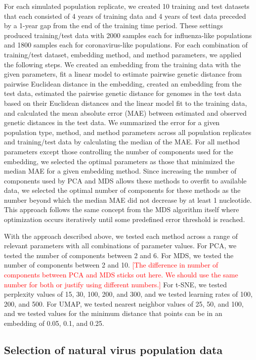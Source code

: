 \documentclass[10pt,letterpaper]{article}
\def\jhc#1{\textcolor{red}{[#1]}}
\begin{document}
For each simulated population replicate, we created 10 training and test datasets that each consisted of 4 years of training data and 4 years of test data preceded by a 1-year gap from the end of the training time period.
These settings produced training/test data with 2000 samples each for influenza-like populations and 1800 samples each for coronavirus-like populations.
For each combination of training/test dataset, embedding method, and method parameters, we applied the following steps.
We created an embedding from the training data with the given parameters, fit a linear model to estimate pairwise genetic distance from pairwise Euclidean distance in the embedding, created an embedding from the test data, estimated the pairwise genetic distance for genomes in the test data based on their Euclidean distances and the linear model fit to the training data, and calculated the mean absolute error (MAE) between estimated and observed genetic distances in the test data.
We summarized the error for a given population type, method, and method parameters across all population replicates and training/test data by calculating the median of the MAE.
For all method parameters except those controlling the number of components used for the embedding, we selected the optimal parameters as those that minimized the median MAE for a given embedding method.
Since increasing the number of components used by PCA and MDS allows these methods to overfit to available data, we selected the optimal number of components for these methods as the number beyond which the median MAE did not decrease by at least 1 nucleotide.
This approach follows the same concept from the MDS algorithm itself where optimization occurs iteratively until some predefined error threshold is reached.

With the approach described above, we tested each method across a range of relevant parameters with all combinations of parameter values.
For PCA, we tested the number of components between 2 and 6.
For MDS, we tested the number of components between 2 and 10.
\jhc{The difference in number of components between PCA and MDS sticks out here. We should use the same number for both or justify using different numbers.}
For t-SNE, we tested perplexity values of 15, 30, 100, 200, and 300, and we tested learning rates of 100, 200, and 500.
For UMAP, we tested nearest neighbor values of 25, 50, and 100, and we tested values for the minimum distance that points can be in an embedding of 0.05, 0.1, and 0.25.

\subsection*{Selection of natural virus population data}
\end{document}
